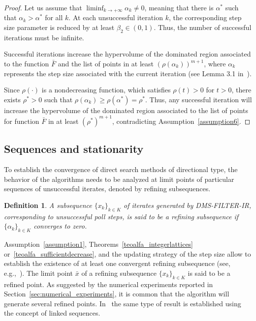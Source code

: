 \documentclass[12pt]{article}
\newtheorem{definition}[theorem]{Definition}
\newcommand{\set}[1]{\{#1\}}
\begin{document}
\begin{proof}
Let us assume that $\displaystyle\liminf_{k\to +\infty}
\alpha_k\neq 0$, meaning that there is $\alpha^*$ such that
$\alpha_k>\alpha^*$ for all $k$. At each unsuccessful iteration
$k$, the corresponding step size parameter is reduced by at least
$\beta_2\in (0,1)$. Thus, the number of successful iterations must
be infinite.

Successful iterations increase the hypervolume of the dominated
region associated to the function $\bar{F}$ and the list of points
in at least $(\rho(\alpha_k))^{m+1}$, where $\alpha_k$ represents
the step size associated with the current iteration (see Lemma 3.1
in~\cite{custodio2021}).

Since $\rho(\cdot)$ is  a nondecreasing function, which satisfies
$\rho(t)>0$ for $t>0$, there exists $\rho^*>0$ such that
$\rho(\alpha_k)\geq \rho(\alpha^*)=\rho^*$. Thus, any successful
iteration will increase the hypervolume of the dominated region
associated to the list of points for function $\bar{F}$ in at
least $(\rho^*)^{m+1}$, contradicting
Assumption~\ref{assumption6}.
\end{proof}

\subsection{Sequences and stationarity}

To establish the convergence of direct search methods of
directional type, the behavior of the algorithms needs to be
analyzed at limit points of particular sequences of unsuccessful
iterates, denoted by refining subsequences.

\begin{definition}
A subsequence $\set{x_k}_{k\in K}$ of iterates generated by
DMS-FILTER-IR, corresponding to unsuccessful poll steps, is said
to be a refining subsequence if $\set{\alpha_k}_{k\in K}$
converges to zero.
\end{definition}

Assumption~\ref{assumption1},
Theorems~\ref{teoalfa_integerlattices}
or~\ref{teoalfa_sufficientdecrease}, and the updating strategy of
the step size allow to establish the existence of at least one
convergent refining subsequence (see, e.g.,~\cite[Section
7.3]{conn2009}). The limit point $\bar{x}$ of a refining
subsequence $\set{x_k}_{k\in K}$ is said to be a refined point. As
suggested by the numerical experiments reported in
Section~\ref{sec:numerical_experiments}, it is common that the
algorithm will generate several refined points.
In~\cite{bigeon2020} the same type of result is established using
the concept of linked sequences.
\end{document}
